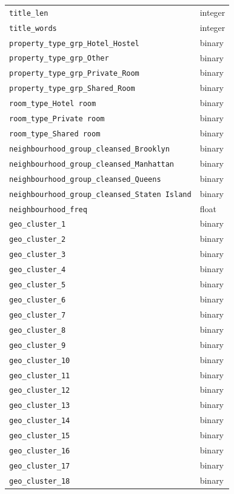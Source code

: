 \documentclass[journal]{IEEEtran}
\begin{document}
\begin{longtable}{p{2.2in}p{0.8in}}
\texttt{title\_len} & integer \\
\texttt{title\_words} & integer \\
\texttt{property\_type\_grp\_Hotel\_Hostel} & binary \\
\texttt{property\_type\_grp\_Other} & binary \\
\texttt{property\_type\_grp\_Private\_Room} & binary \\
\texttt{property\_type\_grp\_Shared\_Room} & binary \\
\texttt{room\_type\_Hotel room} & binary \\
\texttt{room\_type\_Private room} & binary \\
\texttt{room\_type\_Shared room} & binary \\
\texttt{neighbourhood\_group\_cleansed\_Brooklyn} & binary \\
\texttt{neighbourhood\_group\_cleansed\_Manhattan} & binary \\
\texttt{neighbourhood\_group\_cleansed\_Queens} & binary \\
\texttt{neighbourhood\_group\_cleansed\_Staten Island} & binary \\
\texttt{neighbourhood\_freq} & float \\
\texttt{geo\_cluster\_1} & binary \\
\texttt{geo\_cluster\_2} & binary \\
\texttt{geo\_cluster\_3} & binary \\
\texttt{geo\_cluster\_4} & binary \\
\texttt{geo\_cluster\_5} & binary \\
\texttt{geo\_cluster\_6} & binary \\
\texttt{geo\_cluster\_7} & binary \\
\texttt{geo\_cluster\_8} & binary \\
\texttt{geo\_cluster\_9} & binary \\
\texttt{geo\_cluster\_10} & binary \\
\texttt{geo\_cluster\_11} & binary \\
\texttt{geo\_cluster\_12} & binary \\
\texttt{geo\_cluster\_13} & binary \\
\texttt{geo\_cluster\_14} & binary \\
\texttt{geo\_cluster\_15} & binary \\
\texttt{geo\_cluster\_16} & binary \\
\texttt{geo\_cluster\_17} & binary \\
\texttt{geo\_cluster\_18} & binary \\

\end{longtable}
\end{document}
